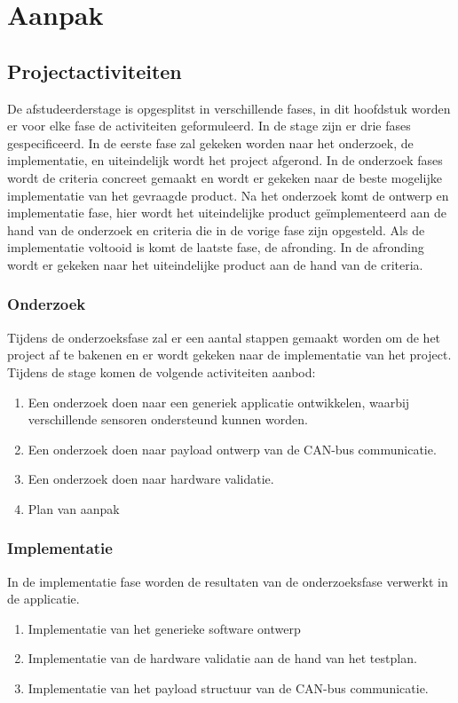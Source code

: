 \chapter{Aanpak} \label{ch:aanpak}

\section{Projectactiviteiten}
De afstudeerderstage is opgesplitst in verschillende fases, in dit hoofdstuk worden er voor elke fase de activiteiten geformuleerd. In de stage zijn er drie fases gespecificeerd. In de eerste fase zal gekeken worden naar het onderzoek, de implementatie, en uiteindelijk wordt het project afgerond. In de onderzoek fases wordt de criteria concreet gemaakt en wordt er gekeken naar de beste mogelijke implementatie van het gevraagde product. Na het onderzoek komt de ontwerp en implementatie fase, hier wordt het uiteindelijke product geïmplementeerd aan de hand van de onderzoek en criteria die in de vorige fase zijn opgesteld. Als de implementatie voltooid is komt de laatste fase, de afronding. In de afronding wordt er gekeken naar het uiteindelijke product aan de hand van de criteria.

\subsection{Onderzoek}
Tijdens de onderzoeksfase zal er een aantal stappen gemaakt worden om de het project af te bakenen en er wordt gekeken naar de implementatie van het project. Tijdens de stage komen de volgende activiteiten aanbod:
\begin{enumerate}
	\item Een onderzoek doen naar een generiek applicatie ontwikkelen, waarbij verschillende sensoren ondersteund kunnen worden.
	\item Een onderzoek doen naar payload ontwerp van de CAN-bus communicatie.
	\item Een onderzoek doen naar hardware validatie.
	\item Plan van aanpak
\end{enumerate}

\subsection{Implementatie}
In de implementatie fase worden de resultaten van de onderzoeksfase verwerkt in de applicatie. 
\begin{enumerate}
	\item Implementatie van het generieke software ontwerp
	\item Implementatie van de hardware validatie aan de hand van het testplan.
	\item Implementatie van het payload structuur van de CAN-bus communicatie.
\end{enumerate}

